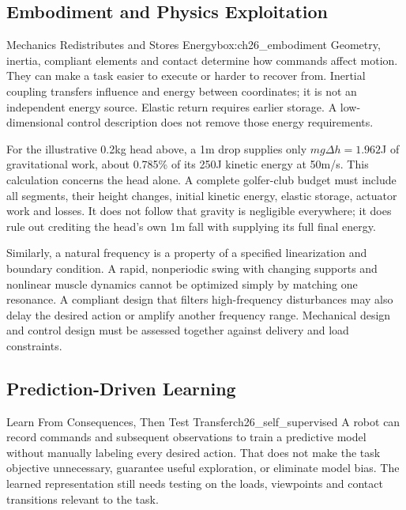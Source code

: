 \subsection{Embodiment and Physics Exploitation}
\label{subsec:ch26_embodiment}

\begin{principle}{Mechanics Redistributes and Stores Energy}{box:ch26_embodiment}
Geometry, inertia, compliant elements and contact determine how commands affect motion. They can make a task easier to execute or harder to recover from. Inertial coupling transfers influence and energy between coordinates; it is not an independent energy source. Elastic return requires earlier storage. A low-dimensional control description does not remove those energy requirements.
\end{principle}

For the illustrative 0.2kg head above, a 1m drop supplies only $m g\Delta h=1.962$J of gravitational work, about 0.785\% of its 250J kinetic energy at 50m/s. This calculation concerns the head alone. A complete golfer-club budget must include all segments, their height changes, initial kinetic energy, elastic storage, actuator work and losses. It does not follow that gravity is negligible everywhere; it does rule out crediting the head's own 1m fall with supplying its full final energy.

Similarly, a natural frequency is a property of a specified linearization and boundary condition. A rapid, nonperiodic swing with changing supports and nonlinear muscle dynamics cannot be optimized simply by matching one resonance. A compliant design that filters high-frequency disturbances may also delay the desired action or amplify another frequency range. Mechanical design and control design must be assessed together against delivery and load constraints.

\subsection{Prediction-Driven Learning}
\label{subsec:ch26_prediction_learning}

\begin{example}{Learn From Consequences, Then Test Transfer}{ch26_self_supervised}
A robot can record commands and subsequent observations to train a predictive model without manually labeling every desired action. That does not make the task objective unnecessary, guarantee useful exploration, or eliminate model bias. The learned representation still needs testing on the loads, viewpoints and contact transitions relevant to the task.
\end{example}

